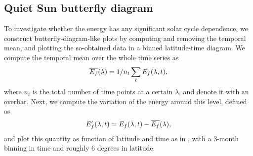 \documentclass{aa}
\begin{document}


\subsection{Quiet Sun \fff butterfly diagram}\label{qsf}


To investigate whether the \fff energy has any significant solar cycle dependence, we construct butterfly-diagram-like plots by computing and removing the temporal mean, and plotting the so-obtained data in a binned latitude-time diagram. 
We compute the temporal mean over the whole time series as 
\begin{equation}
    \overline{E_f}(\lambda) = 1/n_t \sum_t E_f(\lambda,t),
\end{equation}
where $n_t$ is the total number of time points at a certain $\lambda$, and denote it with an overbar. Next, we compute the variation of the \fff energy around this level, defined as
\begin{equation}
    E_f'(\lambda,t)=E_f(\lambda,t)-\overline{E_f}(\lambda),
\end{equation}
and plot this quantity as function of latitude and time as in , with a 3-month binning in time and roughly 6 degrees in latitude. 
\end{document}
